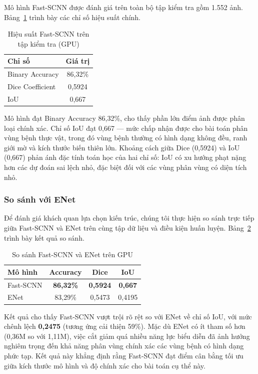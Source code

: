 \documentclass[conference]{IEEEtran}
\begin{document}
Mô hình Fast-SCNN được đánh giá trên toàn bộ tập kiểm tra gồm 1.552 ảnh. Bảng~\ref{tab:pc_results} trình bày các chỉ số hiệu suất chính.

\begin{table}[htbp]
\centering
\caption{Hiệu suất Fast-SCNN trên tập kiểm tra (GPU)}
\label{tab:pc_results}
\begin{tabular}{lc}
\toprule
\textbf{Chỉ số} & \textbf{Giá trị} \\
\midrule
Binary Accuracy  & 86,32\% \\
Dice Coefficient & 0,5924 \\
IoU              & 0,667 \\
\bottomrule
\end{tabular}
\end{table}

Mô hình đạt Binary Accuracy 86,32\%, cho thấy phần lớn điểm ảnh được phân loại chính xác. Chỉ số IoU đạt 0,667 --- mức chấp nhận được cho bài toán phân vùng bệnh thực vật, trong đó vùng bệnh thường có hình dạng không đều, ranh giới mờ và kích thước biến thiên lớn. Khoảng cách giữa Dice (0,5924) và IoU (0,667) phản ánh đặc tính toán học của hai chỉ số: IoU có xu hướng phạt nặng hơn các dự đoán sai lệch nhỏ, đặc biệt đối với các vùng phân vùng có diện tích nhỏ.

\subsubsection{So sánh với ENet}

Để đánh giá khách quan lựa chọn kiến trúc, chúng tôi thực hiện so sánh trực tiếp giữa Fast-SCNN và ENet trên cùng tập dữ liệu và điều kiện huấn luyện. Bảng~\ref{tab:compare_enet} trình bày kết quả so sánh.

\begin{table}[htbp]
\centering
\caption{So sánh Fast-SCNN và ENet trên GPU}
\label{tab:compare_enet}
\begin{tabular}{lccc}
\toprule
\textbf{Mô hình} & \textbf{Accuracy} & \textbf{Dice} & \textbf{IoU} \\
\midrule
Fast-SCNN & \textbf{86,32\%} & \textbf{0,5924} & \textbf{0,667} \\
ENet & 83,29\% & 0,5473 & 0,4195 \\ 
\bottomrule
\end{tabular}
\end{table}

Kết quả cho thấy Fast-SCNN vượt trội rõ rệt so với ENet về chỉ số IoU, với mức chênh lệch \textbf{0,2475} (tương ứng cải thiện 59\%). Mặc dù ENet có ít tham số hơn (0,36M so với 1,11M), việc cắt giảm quá nhiều năng lực biểu diễn đã ảnh hưởng nghiêm trọng đến khả năng phân vùng chính xác các vùng bệnh có hình dạng phức tạp. Kết quả này khẳng định rằng Fast-SCNN đạt điểm cân bằng tối ưu giữa kích thước mô hình và độ chính xác cho bài toán cụ thể này.
\end{document}
